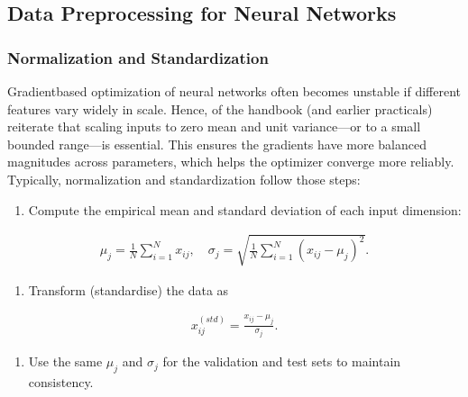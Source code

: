 \documentclass[letterpaper,10pt,english]{jupyterBook}
\begin{document}
\subsection{Data Preprocessing for Neural Networks}
\label{\detokenize{04:data-preprocessing-for-neural-networks}}

\subsubsection{Normalization and Standardization}
\label{\detokenize{04:normalization-and-standardization}}
\sphinxAtStartPar
Gradient\sphinxhyphen{}based optimization of neural networks often becomes unstable if different features vary widely in scale. Hence,  of the handbook (and earlier practicals) reiterate that scaling inputs to zero mean and unit variance—or to a small bounded range—is essential. This ensures the gradients have more balanced magnitudes across parameters, which helps the optimizer converge more reliably. Typically, normalization and standardization follow those steps:
\begin{enumerate}
%
\item {} 
\sphinxAtStartPar
Compute the empirical mean and standard deviation of each input dimension:

\end{enumerate}
\begin{equation*}
\begin{split}
\mu_j = \frac{1}{N} \sum_{i=1}^N x_{ij}, \quad
\sigma_j = \sqrt{\frac{1}{N}\sum_{i=1}^N (x_{ij}-\mu_j)^2}.
\end{split}
\end{equation*}\begin{enumerate}
%
\setcounter{enumi}{1}
\item {} 
\sphinxAtStartPar
Transform (standardise) the data as

\end{enumerate}
\begin{equation*}
\begin{split}
x_{ij}^{(std)} = \frac{x_{ij} - \mu_j}{\sigma_j}.
\end{split}
\end{equation*}\begin{enumerate}
%
\setcounter{enumi}{2}
\item {} 
\sphinxAtStartPar
Use the same \(\mu_j\) and \(\sigma_j\) for the validation and test sets to maintain consistency.

\end{enumerate}
\end{document}
